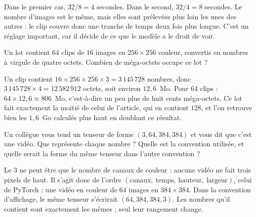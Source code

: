 \begin{solution}
Dans le premier cas, $32 / 8 = 4$ secondes. Dans le second,
$32 / 4 = 8$ secondes. Le nombre d'images est le même, mais elles sont
prélevées plus loin les unes des autres : le clip couvre donc une tranche
de temps deux fois plus longue. C'est un réglage important, car il décide
de ce que le modèle a le droit de voir.
\end{solution}

\begin{exercice}
Un lot contient $64$ clips de $16$ images en $256 \times 256$ couleur,
convertis en nombres à virgule de quatre octets. Combien de méga-octets
occupe ce lot ?
\end{exercice}

\begin{solution}
Un clip contient $16 \times 256 \times 256 \times 3 = 3\,145\,728$ nombres,
donc $3\,145\,728 \times 4 = 12\,582\,912$ octets, soit environ $12{,}6$~Mo.
Pour $64$ clips : $64 \times 12{,}6 \approx 806$~Mo, c'est-à-dire un peu
plus de huit cents méga-octets. Ce lot fait exactement la moitié de celui
de l'article, qui en contient $128$, et l'on retrouve bien les $1{,}6$~Go
calculés plus haut en doublant ce résultat.
\end{solution}

\begin{exercice}
Un collègue vous tend un tenseur de forme $(3, 64, 384, 384)$ et vous dit
que c'est une vidéo. Que représente chaque nombre ? Quelle est la
convention utilisée, et quelle serait la forme du même tenseur dans l'autre
convention ?
\end{exercice}

\begin{solution}
Le $3$ ne peut être que le nombre de canaux de couleur : aucune vidéo ne
fait trois pixels de haut. Il s'agit donc de l'ordre
$(\text{canaux},\ \text{temps},\ \text{hauteur},\ \text{largeur})$, celui de
PyTorch : une vidéo en couleur de $64$ images en $384 \times 384$. Dans la
convention d'affichage, le même tenseur s'écrirait
$(64, 384, 384, 3)$. Les nombres qu'il contient sont exactement les mêmes ;
seul leur rangement change.
\end{solution}
